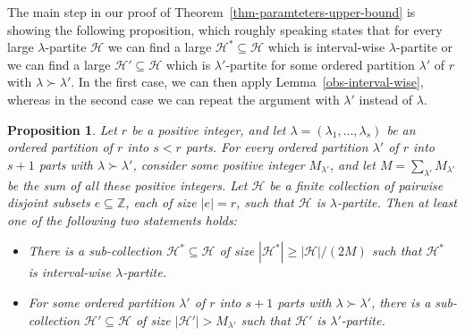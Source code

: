 \documentclass{aic}
\newtheorem{proposition}[theorem]{Proposition}
\theoremstyle{definition}
\numberwithin{equation}{section}
\numberwithin{figure}{section}
\newcommand{\su}{\subseteq}
\newcommand{\Z}{\mathbb{Z}}
\newcommand{\HH}{\mathcal{H}}
\begin{document}
The main step in our proof of Theorem~\ref{thm-paramteters-upper-bound} is showing the following proposition, which roughly speaking states that for every large $\lambda$-partite $\HH$ we can find a large $\HH^*\su \HH$ which is interval-wise $\lambda$-partite or we can find a large $\HH'\su \HH$ which is $\lambda'$-partite for some ordered partition $\lambda'$ of $r$ with $\lambda\succ \lambda'$. In the first case, we can then apply Lemma~\ref{obs-interval-wise}, whereas in the second case we can repeat the argument with $\lambda'$ instead of $\lambda$.

\begin{proposition}\label{prop-two-options}
Let $r$ be a positive integer, and let $\lambda=(\lambda_1,\dots,\lambda_s)$ be an ordered partition of $r$ into $s<r$ parts. For every ordered partition $\lambda'$ of $r$ into $s+1$ parts with $\lambda\succ\lambda'$, consider some positive integer $M_{\lambda'}$, and let $M=\sum_{\lambda'} M_{\lambda'}$ be the sum of all these positive integers. Let $\HH$ be a finite collection of pairwise disjoint subsets $e\su \Z$, each of size $|e|=r$, such that $\HH$ is $\lambda$-partite. Then at least one of the following two statements holds:
\begin{itemize}
    \item[(a)] There is a sub-collection $\HH^*\su \HH$ of size $|\HH^*|\ge |\HH|/(2M)$ such that $\HH^*$ is interval-wise $\lambda$-partite.
    \item[(b)] For some ordered partition $\lambda'$ of $r$ into $s+1$ parts with $\lambda\succ\lambda'$, there is a sub-collection $\HH'\su \HH$ of size $|\HH'|>M_{\lambda'}$ such that $\HH'$ is $\lambda'$-partite.
\end{itemize}
\end{proposition}
\end{document}
